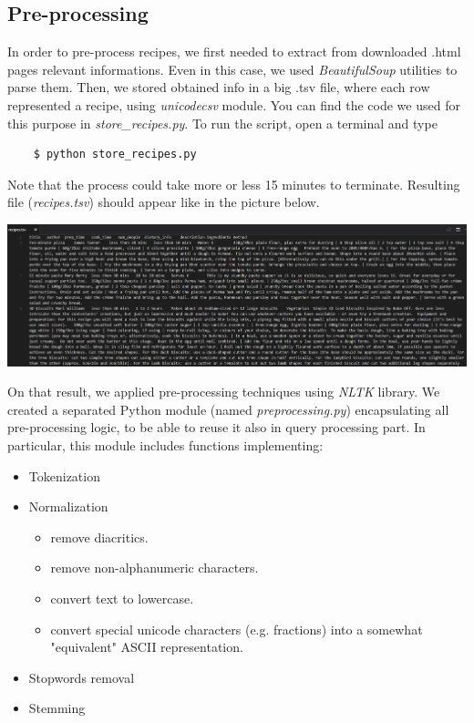 \subsection{Pre-processing}

In order to pre-process recipes, we first needed to extract from downloaded .html pages relevant informations.  Even in this case, we used \textit{BeautifulSoup}\cite{beaut_soup} utilities to parse them. Then, we stored obtained info in a big .tsv file, where each row represented a recipe, using \textit{unicodecsv}\cite{csv} module. You can find the code we used for this purpose in \textit{store\_recipes.py}. To run the script, open a terminal and type
\begin{lstlisting}
	$ python store_recipes.py
\end{lstlisting}
Note that the process could take more or less 15 minutes to terminate. Resulting file (\textit{recipes.tsv}) should appear like in the picture below.
\begin{center}
	\vspace{5mm}
	\includegraphics[scale=0.3]{img/recipes-tsv.jpg}
\end{center}
On that result, we applied pre-processing techniques using \textit{NLTK}\cite{nltk} library. We created a separated Python module (named \textit{preprocessing.py}) encapsulating all pre-processing logic, to be able to reuse it also in query processing part. In particular, this module includes functions implementing:
\begin{itemize}
	\item Tokenization
	\item Normalization
	\begin{itemize}
		\item remove diacritics.
		\item remove non-alphanumeric characters.
		\item convert text to lowercase.
		\item convert special unicode characters (e.g. fractions) into a somewhat "equivalent" ASCII representation.
	\end{itemize}
	\item Stopwords removal
	\item Stemming
\end{itemize}
